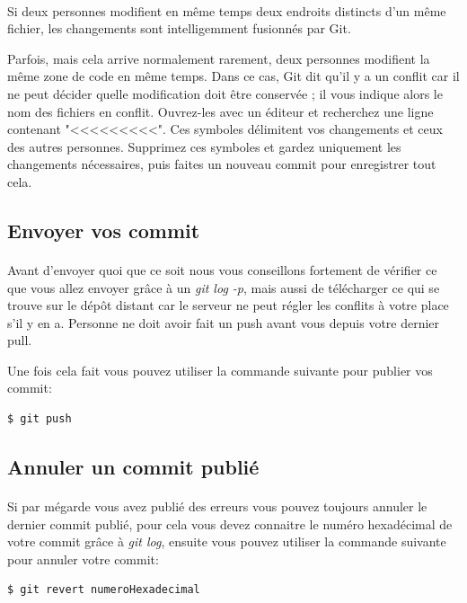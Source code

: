 \documentclass[french, a4paper, 12pt, titlepage]{article}
\begin{document}
\paragraph{}Si deux personnes modifient en même temps deux endroits distincts d’un même fichier, les changements sont intelligemment fusionnés par Git.

Parfois, mais cela arrive normalement rarement, deux personnes modifient la même zone de code en même temps. Dans ce cas, Git dit qu’il y a un conflit car il ne peut décider quelle modification doit être conservée ; il vous indique alors le nom des fichiers en conflit. Ouvrez-les avec un éditeur et recherchez une ligne contenant "<<<<<<<<<". Ces symboles délimitent vos changements et ceux des autres personnes. Supprimez ces symboles et gardez uniquement les changements nécessaires, puis faites un nouveau commit pour enregistrer tout cela.

\subsection{Envoyer vos commit}
\paragraph{}Avant d'envoyer quoi que ce soit nous vous conseillons fortement de vérifier ce que vous allez envoyer grâce à un \emph{git log -p}, mais aussi de télécharger ce qui se trouve sur le dépôt distant car le serveur ne peut régler les conflits à votre place s’il y en a. Personne ne doit avoir fait un push avant vous depuis votre dernier pull.

Une fois cela fait vous pouvez utiliser la commande suivante pour publier vos commit:
\begin{lstlisting}
$ git push
\end{lstlisting}

\subsection{Annuler un commit publié}
\paragraph{}Si par mégarde vous avez publié des erreurs vous pouvez toujours annuler le dernier commit publié, pour cela vous devez connaitre le numéro hexadécimal de votre commit grâce à \emph{git log}, ensuite vous pouvez utiliser la commande suivante pour annuler votre commit:
\begin{lstlisting}
$ git revert numeroHexadecimal
\end{lstlisting}
\end{document}
